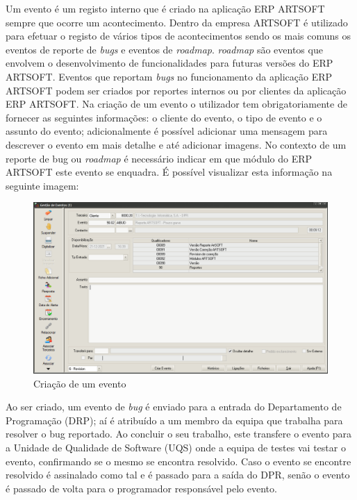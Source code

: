 \documentclass[sigplan]{acmart}
\begin{document}
Um evento é um registo interno que é criado na aplicação ERP ARTSOFT sempre que ocorre um acontecimento. Dentro da empresa ARTSOFT é utilizado para efetuar o registo de vários tipos de acontecimentos sendo os mais comuns os eventos de reporte de \textit{bugs} e eventos de \textit{roadmap}. \textit{roadmap} são eventos que envolvem o desenvolvimento de funcionalidades para futuras versões do ERP ARTSOFT. Eventos que reportam \textit{bugs} no funcionamento da aplicação ERP ARTSOFT podem ser criados por reportes internos ou por clientes da aplicação ERP ARTSOFT. Na criação de um evento o utilizador tem obrigatoriamente de fornecer as seguintes informações: o cliente do evento, o tipo de evento e o assunto do evento; adicionalmente é possível adicionar uma mensagem para descrever o evento em mais detalhe e até adicionar imagens. No contexto de um reporte de bug ou \textit{roadmap} é necessário indicar em que módulo do ERP ARTSOFT este evento se enquadra. É possível visualizar esta informação na seguinte imagem:
\FloatBarrier
\begin{figure}[htbp]
	\centerline{\includegraphics[width=\linewidth]{figures/evento_criacao.png}}
	\caption{Criação de um evento}
	\label{fig1}
\end{figure}
\FloatBarrier
Ao ser criado, um evento de \textit{bug} é enviado para a entrada do Departamento de Programação (DRP); aí é atribuído a um membro da equipa que trabalha para resolver o bug reportado. Ao concluir o seu trabalho, este transfere o evento para a Unidade de Qualidade de Software (UQS) onde a equipa de testes vai testar o evento, confirmando se o mesmo se encontra resolvido. Caso o evento se encontre resolvido é assinalado como tal e é passado para a saída do DPR, senão o evento é passado de volta para o programador responsável pelo evento.
\end{document}
